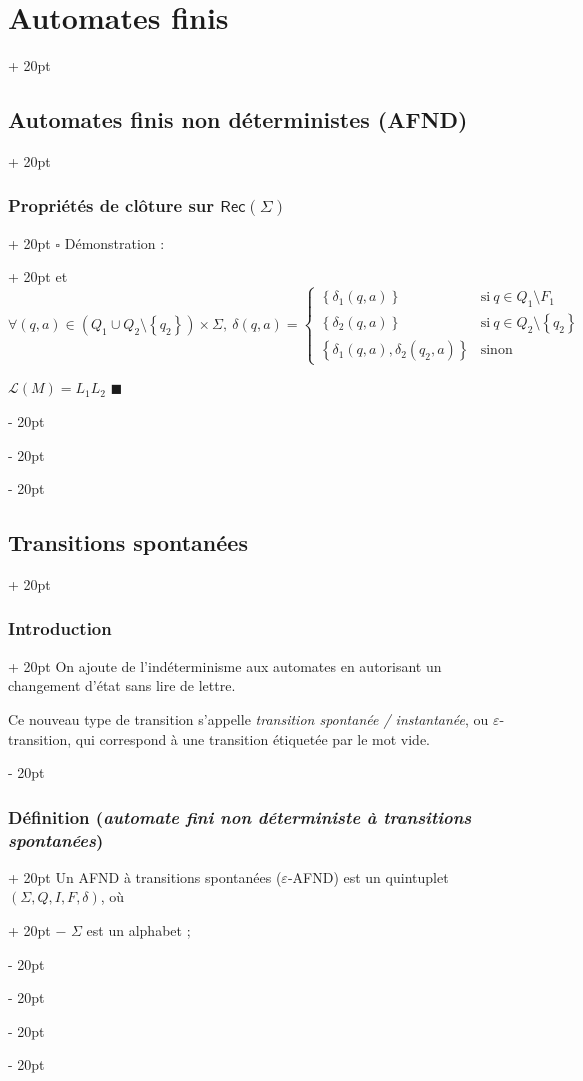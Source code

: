 \documentclass[a4paper, 12pt, twoside]{article}
\newcommand{\lr}[1]{\left( #1 \right)}
\newcommand{\set}[1]{\left\{ #1 \right\}}
\newcommand{\ind}[1][20pt]{\advance\leftskip + #1}
\newcommand{\deind}[1][20pt]{\advance\leftskip - #1}
\newenvironment{indt}[2][20pt]{#2 \par \ind[#1]}{\par \deind} %
\newenvironment{proof}[1][{Démonstration :}]{\begin{indt}{$\square$ #1}}{$\blacksquare$ \end{indt}}
\newcommand{\Rec}[1]{\mathsf{Rec}\!\lr{#1}}
\begin{document}
\begin{indt}{\section{Automates finis}}
\begin{indt}{\subsection{Automates finis non déterministes (AFND)}}
\begin{indt}{\subsubsection{Propriétés de clôture sur $\Rec \Sigma$}}
\begin{proof}
                    et
                    \[
                        \forall (q, a) \in \lr{Q_1 \cup Q_2 \setminus \set{q_2}} \times \Sigma,\
                        \delta(q, a) =
                        \begin{cases}
                            \set{\delta_1(q, a)}
                            & \text{si}\ q \in Q_1 \setminus F_1
                            \\
                            \set{\delta_2(q, a)}
                            & \text{si}\ q \in Q_2 \setminus \set{q_2}
                            \\
                            \set{\delta_1(q, a), \delta_2(q_2, a)}
                            & \text{sinon}
                        \end{cases}
                    \]

                     $\mathcal L(M) = L_1 L_2$
                \end{proof}
            \end{indt}
        \end{indt}

        \vspace{12pt}
        
        \begin{indt}{\subsection{Transitions spontanées}}
            \begin{indt}{\subsubsection{Introduction}}
                On ajoute de l'indéterminisme aux automates en autorisant un changement d'état sans lire de lettre.

                Ce nouveau type de transition s'appelle \emph{transition spontanée / instantanée}, ou $\varepsilon$-transition, qui correspond à une transition étiquetée par le mot vide.
            \end{indt}

            \vspace{12pt}
            
            \begin{indt}{\subsubsection{Définition (\textit{automate fini non déterministe à transitions spontanées})}}
                \begin{indt}{Un AFND à transitions spontanées ($\varepsilon$-AFND) est un quintuplet $(\Sigma, Q, I, F, \delta)$, où}
                    $-$ $\Sigma$ est un alphabet ;


\end{indt}
\end{indt}
\end{indt}
\end{indt}
\end{document}
